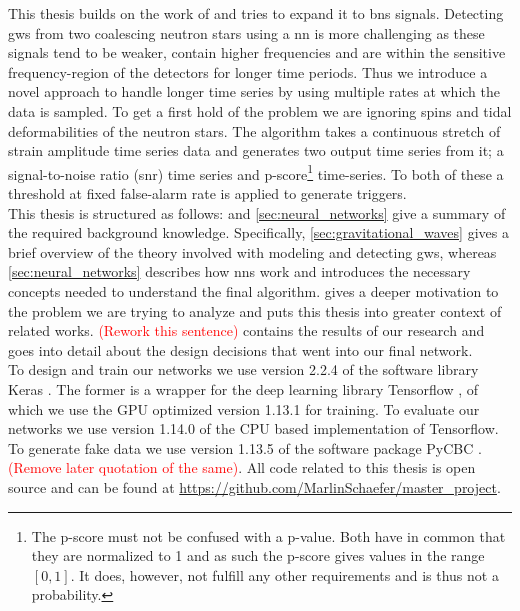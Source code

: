 This thesis builds on the work of \cite{original_deep_filtering} and tries to expand it to \gls{bns} signals. Detecting \gls{gw}s from two coalescing neutron stars using a \gls{nn} is more challenging as these signals tend to be weaker, contain higher frequencies and are within the sensitive frequency-region of the detectors for longer time periods. Thus we introduce a novel approach to handle longer time series by using multiple rates at which the data is sampled. To get a first hold of the problem we are ignoring spins and tidal deformabilities of the neutron stars. The algorithm takes a continuous stretch of strain amplitude time series data and generates two output time series from it; a signal-to-noise ratio (\gls{snr}) time series and p-score\footnote{The p-score must not be confused with a p-value. Both have in common that they are normalized to 1 and as such the p-score gives values in the range $\left[0,1\right]$. It does, however, not fulfill any other requirements and is thus not a probability.} time-series. To both of these a threshold at fixed false-alarm rate is applied to generate triggers.\medskip\\
This thesis is structured as follows:  and \autoref{sec:neural_networks} give a summary of the required background knowledge. Specifically, \autoref{sec:gravitational_waves} gives a brief overview of the theory involved with modeling and detecting \gls{gw}s, whereas \autoref{sec:neural_networks} describes how \gls{nn}s work and introduces the necessary concepts needed to understand the final algorithm.  gives a deeper motivation to the problem we are trying to analyze and puts this thesis into greater context of related works. \textcolor{red}{(Rework this sentence)}  contains the results of our research and goes into detail about the design decisions that went into our final network.\medskip\\
To design and train our networks we use version 2.2.4 of the software library Keras \cite{keras}. The former is a wrapper for the deep learning library Tensorflow \cite{tensorflow}, of which we use the GPU optimized version 1.13.1 for training. To evaluate our networks we use version 1.14.0 of the CPU based implementation of Tensorflow. To generate fake data we use version 1.13.5 of the software package PyCBC \cite{pycbc}. \textcolor{red}{(Remove later quotation of the same)}. All code related to this thesis is open source and can be found at \url{https://github.com/MarlinSchaefer/master_project}.
